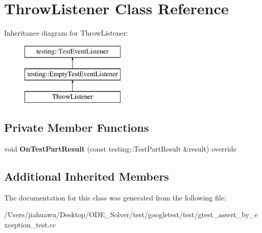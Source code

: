 \hypertarget{class_throw_listener}{}\section{Throw\+Listener Class Reference}
\label{class_throw_listener}
Inheritance diagram for Throw\+Listener\+:\begin{figure}[H]
\begin{center}
\leavevmode
\includegraphics[height=3.000000cm]{class_throw_listener}
\end{center}
\end{figure}
\subsection*{Private Member Functions}
\begin{DoxyCompactItemize}
\item 
\mbox{\label{class_throw_listener_a7756195364cd836b096cd107d46d5ae8}} 
void {\bfseries On\+Test\+Part\+Result} (const testing\+::\+Test\+Part\+Result \&result) override
\end{DoxyCompactItemize}
\subsection*{Additional Inherited Members}


The documentation for this class was generated from the following file\+:\begin{DoxyCompactItemize}
\item 
/\+Users/jiahuawu/\+Desktop/\+O\+D\+E\+\_\+\+Solver/test/googletest/test/gtest\+\_\+assert\+\_\+by\+\_\+exception\+\_\+test.\+cc\end{DoxyCompactItemize}

